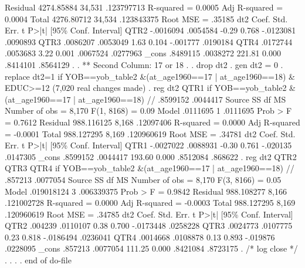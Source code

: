     Residual {\VBAR}  4274.85884    34,531  .123797713   R-squared       =    0.0005
   Adj R-squared   =    0.0004
       Total {\VBAR}  4276.80712    34,534  .123843375   Root MSE        =    .35185
{\smallskip}
         dt2 {\VBAR}      Coef.   Std. Err.      t    P>|t|     [95\% Conf. Interval]
        QTR2 {\VBAR}  -.0016094   .0054584    -0.29   0.768    -.0123081    .0090893
        QTR3 {\VBAR}   .0086207   .0053049     1.63   0.104     -.001777    .0190184
        QTR4 {\VBAR}   .0172744   .0053683     3.22   0.001     .0067524    .0277963
       _cons {\VBAR}   .8489115   .0038272   221.81   0.000     .8414101    .8564129
{\smallskip}
. 
. ** Second Column: 17 or 18
. 
. drop dt2
{\smallskip}
. gen dt2 = 0
{\smallskip}
. replace dt2=1 if YOB==yob_table2 \&(at_age1960==17 | at_age1960==18) \& EDUC>=12
(7,020 real changes made)
{\smallskip}
. reg dt2 QTR1 if YOB==yob_table2  \&(at_age1960==17 | at_age1960==18) // .8599152   .0044417
{\smallskip}
      Source {\VBAR}       SS           df       MS      Number of obs   =     8,170
   F(1, 8168)      =      0.09
       Model {\VBAR}    .0111695         1    .0111695   Prob > F        =    0.7612
    Residual {\VBAR}  988.116125     8,168   .12097406   R-squared       =    0.0000
   Adj R-squared   =   -0.0001
       Total {\VBAR}  988.127295     8,169  .120960619   Root MSE        =    .34781
{\smallskip}
         dt2 {\VBAR}      Coef.   Std. Err.      t    P>|t|     [95\% Conf. Interval]
        QTR1 {\VBAR}  -.0027022   .0088931    -0.30   0.761     -.020135    .0147305
       _cons {\VBAR}   .8599152   .0044417   193.60   0.000     .8512084     .868622
{\smallskip}
. reg dt2 QTR2 QTR3 QTR4 if YOB==yob_table2  \&(at_age1960==17 | at_age1960==18) // .857213   .0077054 
{\smallskip}
      Source {\VBAR}       SS           df       MS      Number of obs   =     8,170
   F(3, 8166)      =      0.05
       Model {\VBAR}  .019018124         3  .006339375   Prob > F        =    0.9842
    Residual {\VBAR}  988.108277     8,166  .121002728   R-squared       =    0.0000
   Adj R-squared   =   -0.0003
       Total {\VBAR}  988.127295     8,169  .120960619   Root MSE        =    .34785
{\smallskip}
         dt2 {\VBAR}      Coef.   Std. Err.      t    P>|t|     [95\% Conf. Interval]
        QTR2 {\VBAR}    .004239   .0110107     0.38   0.700    -.0173448    .0258228
        QTR3 {\VBAR}   .0024773   .0107775     0.23   0.818    -.0186494    .0236041
        QTR4 {\VBAR}   .0014668   .0108878     0.13   0.893     -.019876    .0228095
       _cons {\VBAR}    .857213   .0077054   111.25   0.000     .8421084    .8723175
{\smallskip}
. /* log close */
. 
. 
. 
. 
end of do-file
{\smallskip}

